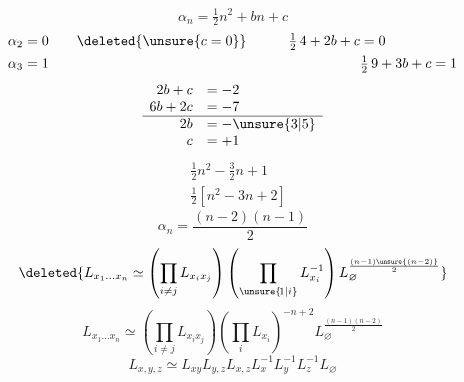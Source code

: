 \[
\alpha_n=\tfrac12 n^2+bn+c
\]
\[
\begin{aligned}
\alpha_2&=0\qquad \deleted{\unsure{c=0}}\qquad &\tfrac12\,4+2b+c&=0\\
\alpha_3&=1&&\tfrac12\,9+3b+c=1
\end{aligned}
\]
\[
\begin{array}{rl}
2b+c&=-2\\6b+2c&=-7\\ \hline
2b&=-\unsure{3|5}\\c&=+1
\end{array}
\]
\[
\begin{aligned}
&\tfrac12 n^2-\tfrac32 n+1\\
&\tfrac12[n^2-3n+2]
\end{aligned}
\]
\[
\boxed{\alpha_n=\frac{(n-2)(n-1)}{2}}
\]
\[
\deleted{L_{x_1\ldots x_n}\simeq
\left(\prod_{i\ne j}L_{x_ix_j}\right)
\left(\prod_{\unsure{\!1|i}} L_{x_i}^{-1}\right)L_{\varnothing}^{\frac{(n-1)\unsure{(n-2)}}{2}}}
\]
\[
\boxed{L_{x_1\ldots x_n}\simeq \left(\prod_{i\ne j}L_{x_ix_j}\right)
\left(\prod_i L_{x_i}\right)^{-n+2}L_{\varnothing}^{\frac{(n-1)(n-2)}2}}
\]
\[
\boxed{L_{x,y,z}\simeq L_{xy}L_{y,z}L_{x,z}L_x^{-1}L_y^{-1}L_z^{-1}L_{\varnothing}}
\]

